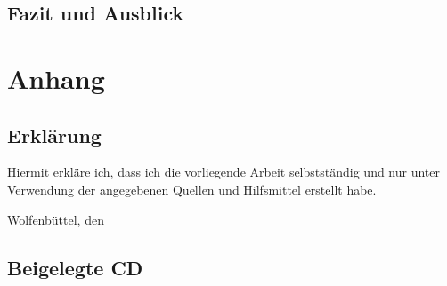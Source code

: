 \documentclass[
  a4paper,					    %
  twoside,
  DIV=calc,     				%
  bibliography=totoc,
  cleardoublepage=empty,
  ngerman,     					%
  final       					%
]{scrbook}
\begin{document}
\chapter{Fazit und Ausblick}
\label{sec:FazitAusblick}










\backmatter
\appendix
\part*{Anhang}


\chapter{Erklärung}
\label{sec:Erklärung}
Hiermit erkläre ich, dass ich die vorliegende Arbeit selbstständig und nur unter Verwendung der angegebenen Quellen und Hilfsmittel erstellt habe.
\vspace{2.5cm} \par
Wolfenbüttel, den %


\chapter{Beigelegte CD}
\label{sec:BeigelegteCD}







%
\nocite{*}
%
\begin{singlespace}

\end{singlespace}
\end{document}
